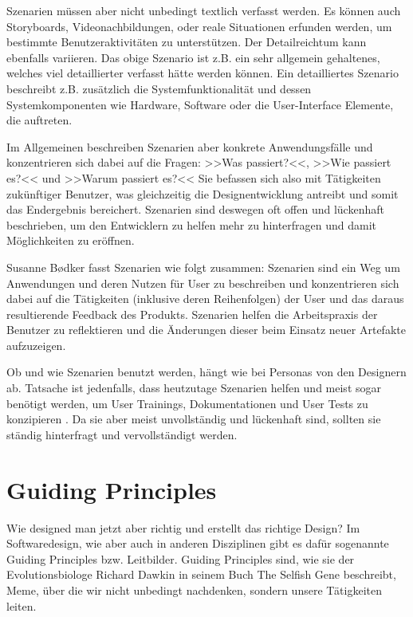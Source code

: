 \medskip Szenarien müssen aber nicht unbedingt textlich verfasst werden. Es können auch Storyboards, Videonachbildungen, oder reale Situationen erfunden werden, um bestimmte Benutzeraktivitäten zu unterstützen. Der Detailreichtum kann ebenfalls variieren. Das obige Szenario ist z.B. ein sehr allgemein gehaltenes, welches viel detaillierter verfasst hätte werden können. Ein detailliertes Szenario beschreibt z.B. zusätzlich die Systemfunktionalität und dessen Systemkomponenten wie Hardware, Software oder die User-Interface Elemente, die auftreten.

\medskip Im Allgemeinen beschreiben Szenarien aber konkrete Anwendungsfälle und konzentrieren sich dabei auf die Fragen: >>Was passiert?<<, >>Wie passiert es?<< und >>Warum passiert es?<< 
Sie befassen sich also mit Tätigkeiten zukünftiger Benutzer, was gleichzeitig die Designentwicklung antreibt und somit das Endergebnis bereichert. Szenarien sind deswegen oft offen und lückenhaft beschrieben, um den Entwicklern zu helfen mehr zu hinterfragen und damit Möglichkeiten zu eröffnen. \citep{Carroll:1995}

\medskip Susanne B{\o}dker fasst Szenarien wie folgt zusammen:
Szenarien sind ein Weg um Anwendungen und deren Nutzen für User zu beschreiben und konzentrieren sich dabei auf die Tätigkeiten (inklusive deren Reihenfolgen) der User und das daraus resultierende Feedback des Produkts. Szenarien helfen die Arbeitspraxis der Benutzer zu reflektieren und die Änderungen dieser beim Einsatz neuer Artefakte aufzuzeigen. \citep{Bodker:1991}

\medskip Ob und wie Szenarien benutzt werden, hängt wie bei Personas von den Designern ab. Tatsache ist jedenfalls, dass heutzutage Szenarien helfen und meist sogar benötigt werden, um User Trainings, Dokumentationen und User Tests zu konzipieren \citep{Carroll:1995}. Da sie aber meist unvollständig und lückenhaft sind, sollten sie ständig hinterfragt und vervollständigt werden.

\section{Guiding Principles} \label{ssec:GuidingPrinciples}
Wie designed man jetzt aber richtig und erstellt das richtige Design? Im Softwaredesign, wie aber auch in anderen Disziplinen gibt es dafür sogenannte Guiding Principles bzw. Leitbilder. Guiding Principles sind, wie sie der Evolutionsbiologe Richard Dawkin in seinem Buch The Selfish Gene beschreibt, Meme, über die wir nicht unbedingt nachdenken, sondern unsere Tätigkeiten leiten.

